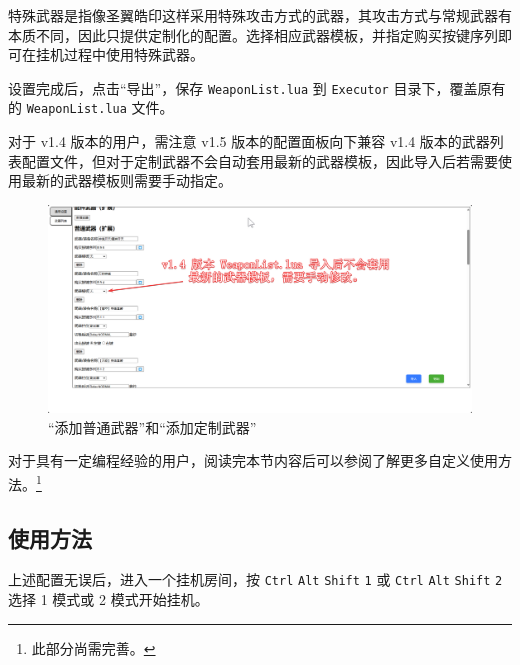 特殊武器是指像圣翼皓印这样采用特殊攻击方式的武器，其攻击方式与常规武器有本质不同，因此只提供定制化的配置。选择相应武器模板，并指定购买按键序列即可在挂机过程中使用特殊武器。

设置完成后，点击“导出”，保存 \lstinline{WeaponList.lua} 到 \lstinline{Executor} 目录下，覆盖原有的 \lstinline{WeaponList.lua} 文件。

对于 v1.4 版本的用户，需注意 v1.5 版本的配置面板向下兼容 v1.4 版本的武器列表配置文件，但对于定制武器不会自动套用最新的武器模板，因此导入后若需要使用最新的武器模板则需要手动指定。

\begin{figure}[H]
    \Centering
    \includegraphics[width=\textwidth]{documents/assets/weapons_for_previous_versions}
    \caption{“添加普通武器”和“添加定制武器”}
\end{figure}

对于具有一定编程经验的用户，阅读完本节内容后可以参阅了解更多自定义使用方法。\footnote{此部分尚需完善。}

\subsection{使用方法}

上述配置无误后，进入一个挂机房间，按 \lstinline{Ctrl} \lstinline{Alt} \lstinline{Shift} \lstinline{1} 或 \lstinline{Ctrl} \lstinline{Alt} \lstinline{Shift} \lstinline{2} 选择 1 模式或 2 模式开始挂机。
